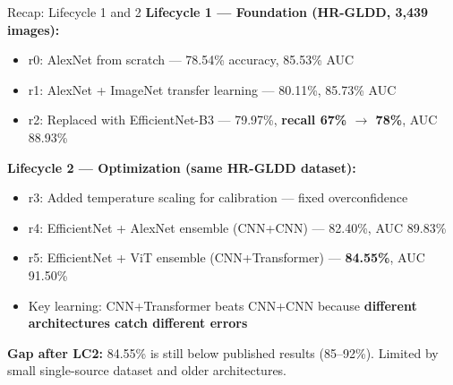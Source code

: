 \documentclass[aspectratio=169]{beamer}
\begin{document}
\begin{frame}{Recap: Lifecycle 1 and 2}
    \textbf{Lifecycle 1 --- Foundation (HR-GLDD, 3,439 images):}
    \begin{itemize}
        \item r0: AlexNet from scratch --- 78.54\% accuracy, 85.53\% AUC
        \item r1: AlexNet + ImageNet transfer learning --- 80.11\%, 85.73\% AUC
        \item r2: Replaced with EfficientNet-B3 --- 79.97\%, \textbf{recall 67\% $\to$ 78\%}, AUC 88.93\%
    \end{itemize}

    \vspace{0.3cm}
    \textbf{Lifecycle 2 --- Optimization (same HR-GLDD dataset):}
    \begin{itemize}
        \item r3: Added temperature scaling for calibration --- fixed overconfidence
        \item r4: EfficientNet + AlexNet ensemble (CNN+CNN) --- 82.40\%, AUC 89.83\%
        \item r5: EfficientNet + ViT ensemble (CNN+Transformer) --- \textbf{84.55\%}, AUC 91.50\%
        \item Key learning: CNN+Transformer beats CNN+CNN because \textbf{different architectures catch different errors}
    \end{itemize}

    \vspace{0.3cm}
    \textbf{Gap after LC2:} 84.55\% is still below published results (85--92\%). Limited by small single-source dataset and older architectures.
\end{frame}
\end{document}

